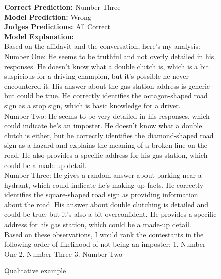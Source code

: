 \begin{figure}[!h]
\small
\begin{framed}
\textbf{Correct Prediction:} Number Three\\
\textbf{Model Prediction:} Wrong\\
\textbf{Judges Predictions:} All Correct\\

\textbf{Model Explanation:}\\
Based on the affidavit and the conversation, here's my analysis:\\
Number One: He seems to be truthful and not overly detailed in his responses. He doesn't know what a double clutch is, which is a bit suspicious for a driving champion, but it's possible he never encountered it. His answer about the gas station address is generic but could be true. He correctly identifies the octagon-shaped road sign as a stop sign, which is basic knowledge for a driver.\\
Number Two: He seems to be very detailed in his responses, which could indicate he's an imposter. He doesn't know what a double clutch is either, but he correctly identifies the diamond-shaped road sign as a hazard and explains the meaning of a broken line on the road. He also provides a specific address for his gas station, which could be a made-up detail.\\
Number Three: He gives a random answer about parking near a hydrant, which could indicate he's making up facts. He correctly identifies the square-shaped road sign as providing information about the road. His answer about double clutching is detailed and could be true, but it's also a bit overconfident. He provides a specific address for his gas station, which could be a made-up detail.\\
Based on these observations, I would rank the contestants in the following order of likelihood of not being an imposter: 1. Number One 2. Number Three 3. Number Two
\end{framed}
\caption{Qualitative example}
\label{fig:3}
\end{figure}




